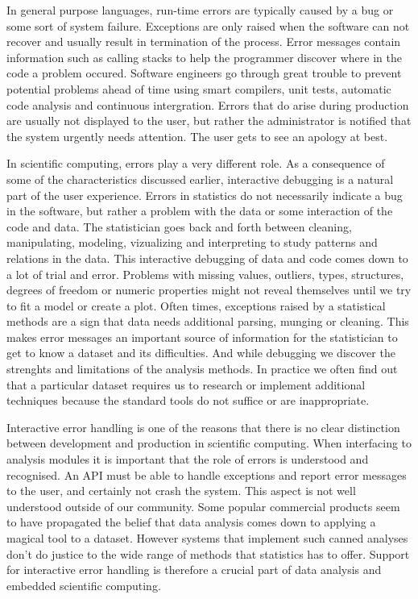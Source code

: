 \documentclass{article}
\begin{document}
In general purpose languages, run-time errors are typically caused by a bug or some sort of system failure. Exceptions are only raised when the software can not recover and usually result in termination of the process. Error messages contain information such as calling stacks to help the programmer discover where in the code a problem occured. Software engineers go through great trouble to prevent potential problems ahead of time using smart compilers, unit tests, automatic code analysis and continuous intergration. Errors that do arise during production are usually not displayed to the user, but rather the administrator is notified that the system urgently needs attention. The user gets to see an apology at best.

In scientific computing, errors play a very different role. As a consequence of some of the characteristics discussed earlier, interactive debugging is a natural part of the user experience. Errors in statistics do not necessarily indicate a bug in the software, but rather a problem with the data or some interaction of the code and data. The statistician goes back and forth between cleaning, manipulating, modeling, vizualizing and interpreting to study patterns and relations in the data. This interactive debugging of data and code comes down to a lot of trial and error. Problems with missing values, outliers, types, structures, degrees of freedom or numeric properties might not reveal themselves until we try to fit a model or create a plot. Often times, exceptions raised by a statistical methods are a sign that data needs additional parsing, munging or cleaning. This makes error messages an important source of information for the statistician to get to know a dataset and its difficulties. And while debugging we discover the strenghts and limitations of the analysis methods. In practice we often find out that a particular dataset requires us to research or implement additional techniques because the standard tools do not suffice or are inappropriate.

Interactive error handling is one of the reasons that there is no clear distinction between development and production in scientific computing. When interfacing to analysis modules it is important that the role of errors is understood and recognised. An API must be able to handle exceptions and report error messages to the user, and certainly not crash the system. This aspect is not well understood outside of our community. Some popular commercial products seem to have propagated the belief that data analysis comes down to applying a magical tool to a dataset. However systems that implement such canned analyses don't do justice to the wide range of methods that statistics has to offer. Support for interactive error handling is therefore a crucial part of data analysis and embedded scientific computing.
\end{document}
